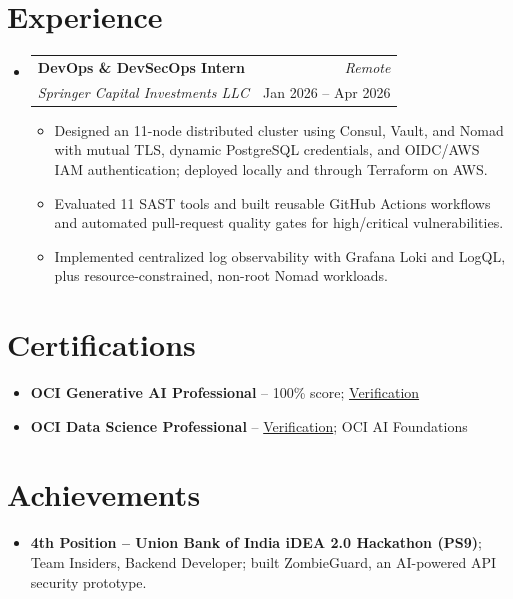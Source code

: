 \documentclass[a4paper,10.5pt]{article}
\makeatletter
\newcommand{\resumeSubHeadingListStart}{
\begin{itemize}[leftmargin=*, itemsep=0pt, parsep=0pt, topsep=0pt]
}
\newcommand{\resumeSubHeadingListEnd}{
\end{itemize}\vspace{-3mm}
}
\newcommand{\resumeItemListStart}{
\begin{itemize}[leftmargin=3ex, itemsep=0pt, parsep=0pt, topsep=0pt]
\small
}
\newcommand{\resumeItemListEnd}{
\end{itemize}\vspace{1mm}
}
\newcommand{\resumeSubheading}[4]{
\item
\begin{tabular*}{0.98\textwidth}[t]{l@{\extracolsep{\fill}}r}
\textbf{#1} & \textit{\footnotesize #4} \\
\textit{\footnotesize #2} & \footnotesize #3
\end{tabular*}
\vspace{-2mm}
}
\makeatother
\begin{document}
\begin{itemize}[leftmargin=*, itemsep=3pt, parsep=0pt, topsep=0pt]
\resumeSubHeadingListEnd

\section{Experience}
\resumeSubHeadingListStart
\resumeSubheading
{DevOps \& DevSecOps Intern}
{Springer Capital Investments LLC}
{Jan 2026 -- Apr 2026}
{Remote}
\resumeItemListStart
\item Designed an 11-node distributed cluster using Consul, Vault, and Nomad with mutual TLS, dynamic PostgreSQL credentials, and OIDC/AWS IAM authentication; deployed locally and through Terraform on AWS.
\item Evaluated 11 SAST tools and built reusable GitHub Actions workflows and automated pull-request quality gates for high/critical vulnerabilities.
\item Implemented centralized log observability with Grafana Loki and LogQL, plus resource-constrained, non-root Nomad workloads.
\resumeItemListEnd
\resumeSubHeadingListEnd

\section{Certifications}
\begin{itemize}[leftmargin=0.15in, itemsep=0pt, parsep=0pt, topsep=0pt]
\small
\item \textbf{OCI Generative AI Professional} -- 100\% score; \href{https://catalog-education.oracle.com/pls/certview/sharebadge?id=DADF9704A57127C47353CA83A73224FA5BBA23ABCFC48F7E95CF32EDB9CC8815}{Verification}
\item \textbf{OCI Data Science Professional} -- \href{https://catalog-education.oracle.com/pls/certview/sharebadge?id=438920B2C0C8FE12FF5756DFCAED07CE9ADF4C83C3CF14EDF27F7F038DD9F432}{Verification}; OCI AI Foundations
\end{itemize}

\section{Achievements}
\begin{itemize}[leftmargin=0.15in, itemsep=0pt, parsep=0pt, topsep=0pt]
\small
\item \textbf{4th Position -- Union Bank of India iDEA 2.0 Hackathon (PS9)}; Team Insiders, Backend Developer; built ZombieGuard, an AI-powered API security prototype.
\end{itemize}
\end{document}
